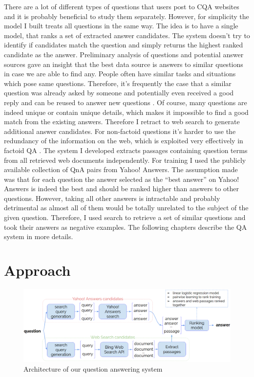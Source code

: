 \documentclass[]{article}
\begin{document}
There are a lot of different types of questions that users post to CQA websites and it is probably beneficial to study them separately.
However, for simplicity the model I built treats all questions in the same way.
The idea is to have a single model, that ranks a set of extracted answer candidates.
The system doesn't try to identify if candidates match the question and simply returns the highest ranked candidate as the answer.
Preliminary analysis of questions and potential answer sources gave an insight that the best data source is answers to similar questions in case we are able to find any.
People often have similar tasks and situations which pose same questions.
Therefore, it's frequently the case that a similar question was already asked by someone and potentially even received a good reply and can be reused to answer new questions \cite{Shtok:2012:LPA:2187836.2187939}.
Of course, many questions are indeed unique or contain unique details, which makes it impossible to find a good match from the existing answers.
Therefore I retract to web search to generate additional answer candidates.
For non-factoid questions it's harder to use the redundancy of the information on the web, which is exploited very effectively in factoid QA \cite{Lin:2007:EPU:1229179.1229180}.
The system I developed extracts passages containing question terms from all retrieved web documents independently.
For training I used the publicly available collection of QnA pairs from Yahoo! Answers.
The assumption made was that for each question the answer selected as the ``best answer'' on Yahoo! Answers is indeed the best and should be ranked higher than answers to other questions.
However, taking all other answers is intractable and probably detrimental as almost all of them would be totally unrelated to the subject of the given question.
Therefore, I used search to retrieve a set of similar questions and took their answers as negative examples.
The following chapters describe the QA system in more details.

\section{Approach}

\begin{figure}
	\includegraphics[width=460px]{img/qa_model}
	\caption{Architecture of our question answering system}
	\label{figure:qa_model}
\end{figure}
\end{document}
